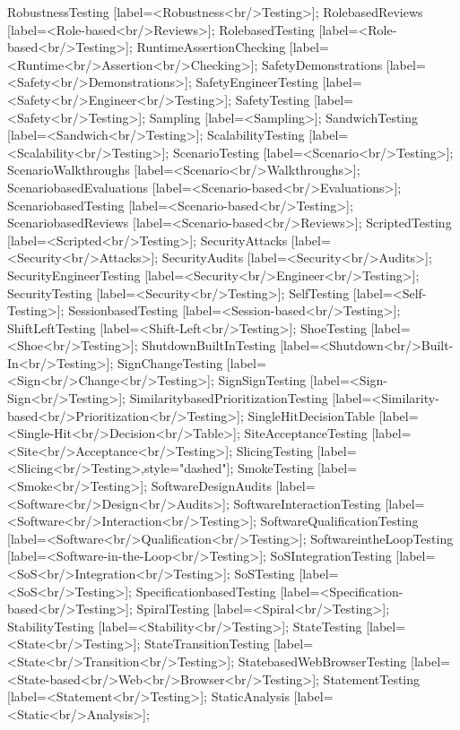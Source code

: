 \documentclass{article}
\begin{document}
{RobustnessTesting [label=<Robustness<br/>Testing>];
RolebasedReviews [label=<Role-based<br/>Reviews>];
RolebasedTesting [label=<Role-based<br/>Testing>];
RuntimeAssertionChecking [label=<Runtime<br/>Assertion<br/>Checking>];
SafetyDemonstrations [label=<Safety<br/>Demonstrations>];
SafetyEngineerTesting [label=<Safety<br/>Engineer<br/>Testing>];
SafetyTesting [label=<Safety<br/>Testing>];
Sampling [label=<Sampling>];
SandwichTesting [label=<Sandwich<br/>Testing>];
ScalabilityTesting [label=<Scalability<br/>Testing>];
ScenarioTesting [label=<Scenario<br/>Testing>];
ScenarioWalkthroughs [label=<Scenario<br/>Walkthroughs>];
ScenariobasedEvaluations [label=<Scenario-based<br/>Evaluations>];
ScenariobasedTesting [label=<Scenario-based<br/>Testing>];
ScenariobasedReviews [label=<Scenario-based<br/>Reviews>];
ScriptedTesting [label=<Scripted<br/>Testing>];
SecurityAttacks [label=<Security<br/>Attacks>];
SecurityAudits [label=<Security<br/>Audits>];
SecurityEngineerTesting [label=<Security<br/>Engineer<br/>Testing>];
SecurityTesting [label=<Security<br/>Testing>];
SelfTesting [label=<Self-Testing>];
SessionbasedTesting [label=<Session-based<br/>Testing>];
ShiftLeftTesting [label=<Shift-Left<br/>Testing>];
ShoeTesting [label=<Shoe<br/>Testing>];
ShutdownBuiltInTesting [label=<Shutdown<br/>Built-In<br/>Testing>];
SignChangeTesting [label=<Sign<br/>Change<br/>Testing>];
SignSignTesting [label=<Sign-Sign<br/>Testing>];
SimilaritybasedPrioritizationTesting [label=<Similarity-based<br/>Prioritization<br/>Testing>];
SingleHitDecisionTable [label=<Single-Hit<br/>Decision<br/>Table>];
SiteAcceptanceTesting [label=<Site<br/>Acceptance<br/>Testing>];
SlicingTesting [label=<Slicing<br/>Testing>,style="dashed"];
SmokeTesting [label=<Smoke<br/>Testing>];
SoftwareDesignAudits [label=<Software<br/>Design<br/>Audits>];
SoftwareInteractionTesting [label=<Software<br/>Interaction<br/>Testing>];
SoftwareQualificationTesting [label=<Software<br/>Qualification<br/>Testing>];
SoftwareintheLoopTesting [label=<Software-in-the-Loop<br/>Testing>];
SoSIntegrationTesting [label=<SoS<br/>Integration<br/>Testing>];
SoSTesting [label=<SoS<br/>Testing>];
SpecificationbasedTesting [label=<Specification-based<br/>Testing>];
SpiralTesting [label=<Spiral<br/>Testing>];
StabilityTesting [label=<Stability<br/>Testing>];
StateTesting [label=<State<br/>Testing>];
StateTransitionTesting [label=<State<br/>Transition<br/>Testing>];
StatebasedWebBrowserTesting [label=<State-based<br/>Web<br/>Browser<br/>Testing>];
StatementTesting [label=<Statement<br/>Testing>];
StaticAnalysis [label=<Static<br/>Analysis>];
}
\end{document}

